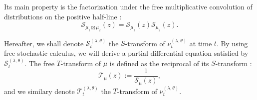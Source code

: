 \documentclass[12pt,reqno]{amsart}
\begin{document}
Its main property is the factorization under the free multiplicative convolution of distributions on the positive half-line :
$$
\mathcal{S}_{\mu_1 \boxtimes \mu_2}(z) = \mathcal{S}_{\mu_1}(z)\mathcal{S}_{\mu_2}(z).
$$
\newcommand{\Sfree}{\mathcal{S}_t^{(\lambda,\theta)}}
\newcommand{\Tfree}{\mathcal{T}_t^{(\lambda,\theta)}}

Hereafter, we shall denote $\mathcal{S}_t^{(\lambda,\theta)}$ the $S$-transform of $\nu_t^{(\lambda,\theta)}$ at time $t$. By using free stochastic calculus, we will derive a partial differential equation satisfied by $\Sfree$. The free $T$-transform of $\mu$ is defined as the reciprocal of its $S$-transform : 
$$
\mathcal{T}_{\mu}(z) := \frac{1}{\mathcal{S}_\mu(z)},
$$
and we similary denote $\mathcal{T}_t^{(\lambda, \theta)}$ the $T$-transform of $\nu_t^{(\lambda,\theta)}$. 
\end{document}
